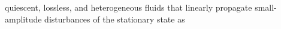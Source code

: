 quiescent,
lossless, and
heterogeneous fluids that linearly propagate
small-amplitude disturbances of
the stationary state as
